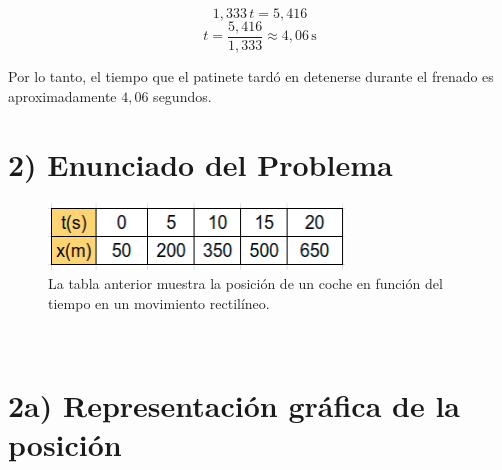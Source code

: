 \documentclass{article}
\begin{document}
\[
1,333 \, t = 5,416 
\]
\[
t = \frac{5,416}{1,333} \approx \boxed{4,06 \, \text{s}}
\]

\justify
Por lo tanto, el tiempo que el patinete tardó en detenerse durante el frenado es aproximadamente \( 4,06 \) segundos.

\section*{2) Enunciado del Problema}


\begin{figure}[h] %
    \centering
    \includegraphics[width=0.7\textwidth]{tabla.png} %
    \caption{La tabla anterior muestra la posición de un coche en función del tiempo en un movimiento rectilíneo.
    }
    \label{fig:tabla}
\end{figure}\


\section*{2a) Representación gráfica de la posición}


\end{document}

